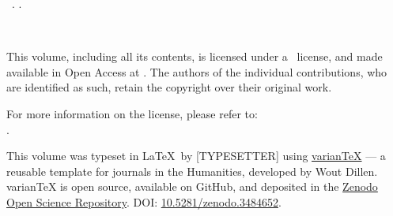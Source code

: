 \null\vfill\small
\noindent\thejournal \ \thevolume. \thejournalsubtitle. \\ \par
\noindent\doclicenseIcon \ \theyear \\ \par 
\noindent This volume, including all its contents, is licensed under a \doclicenseLongNameRef \ license, and made available in Open Access at \href{\thewebsite}{\thewebsite}. The authors of the individual contributions, who are identified as such, retain the copyright over their original work.  \\ \par
\noindent For more information on the \doclicenseNameRef license, please refer to: \\ \doclicenseURL.  \\ \par

\noindent This volume was typeset in \LaTeX~by [TYPESETTER] using \href{https://github.com/WoutDLN/varianTeX}{varianTeX} --- a reusable template for journals in the Humanities, developed by Wout Dillen. varianTeX is open source, available on GitHub, and deposited in the \href{https://about.zenodo.org}{Zenodo Open Science Repository}. DOI: \href{https://zenodo.org/record/3484652#.X0PdDy2w3kI}{10.5281/zenodo.3484652}.  
\newpage